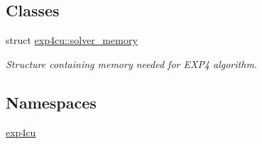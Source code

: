 \subsection*{Classes}
\begin{DoxyCompactItemize}
\item 
struct \hyperlink{structexp4cu_1_1solver__memory}{exp4cu\+::solver\+\_\+memory}
\begin{DoxyCompactList}\small\item\em Structure containing memory needed for E\+X\+P4 algorithm. \end{DoxyCompactList}\end{DoxyCompactItemize}
\subsection*{Namespaces}
\begin{DoxyCompactItemize}
\item 
 \hyperlink{namespaceexp4cu}{exp4cu}
\end{DoxyCompactItemize}
